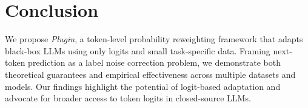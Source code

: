 \vspace{-3mm}
\section{Conclusion}
\vspace{-1mm}
We propose \textit{Plugin}, a token-level probability reweighting framework that adapts black-box LLMs using only logits and small task-specific data. Framing next-token prediction as a label noise correction problem, we demonstrate both theoretical guarantees and empirical effectiveness across multiple datasets and models. Our findings highlight the potential of logit-based adaptation and advocate for broader access to token logits in closed-source LLMs.
